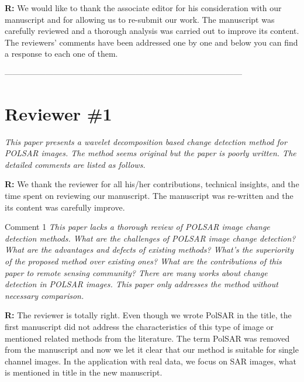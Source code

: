 \documentclass[11pt]{report}
\begin{document}
\medskip

\textbf{R:} We would like to thank the associate editor for his consideration with our manuscript and for allowing us to re-submit our work. The manuscript was carefully reviewed and a thorough analysis was carried out to improve its content. The reviewers' comments have been addressed one by one and below you can find a response to each one of them.

\medskip


\newpage

\vspace{0.25cm}

\noindent---------------------------------------------------------------------------------------
\section*{Reviewer \#1}

\textit{This paper presents a wavelet decomposition based change detection method for POLSAR images. The method seems original but the paper is poorly written. The detailed comments are listed as follows.}

\medskip

\textbf{R:} We thank the reviewer for all his/her contributions, technical insights, and the time spent on reviewing our manuscript. The manuscript was re-written and the its content was carefully improve.

\medskip


\medskip
\begin{mybox}{Comment 1}
\textit{This paper lacks a thorough review of POLSAR image change detection methods. What are the challenges of
POLSAR image change detection? What are the advantages and defects of existing methods? What’s the superiority of
the proposed method over existing ones? What are the contributions of this paper to remote sensing community? There
are many works about change detection in POLSAR images. This paper only addresses the method without necessary
comparison.}

\medskip

\textbf{R:} The reviewer is totally right. Even though we wrote PolSAR in the title, the first manuscript did not address the characteristics of this type of image or mentioned related methods from the literature. The term PolSAR was removed from the manuscript and now we let it clear that our method is suitable for single channel images. In the application with real data, we focus on SAR images, what is mentioned in title in the new manuscript.

\medskip


\end{mybox}
\end{document}
